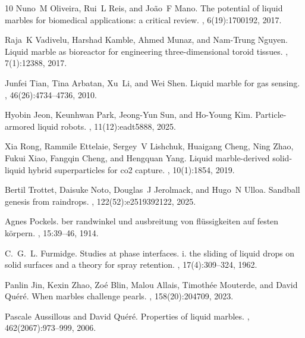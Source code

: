 \documentclass[twocolumn, prl,
 amsmath,amssymb,
 superscriptaddress,aps,
]{revtex4-2}
\begin{document}
\begin{thebibliography}{10}
	Nuno~M Oliveira, Rui~L Reis, and Jo{\~a}o~F Mano.
	\newblock The potential of liquid marbles for biomedical applications: a
	critical review.
	, 6(19):1700192, 2017.
	
	Raja~K Vadivelu, Harshad Kamble, Ahmed Munaz, and Nam-Trung Nguyen.
	\newblock Liquid marble as bioreactor for engineering three-dimensional toroid
	tissues.
	, 7(1):12388, 2017.
	
	Junfei Tian, Tina Arbatan, Xu~Li, and Wei Shen.
	\newblock Liquid marble for gas sensing.
	, 46(26):4734--4736, 2010.
	
	Hyobin Jeon, Keunhwan Park, Jeong-Yun Sun, and Ho-Young Kim.
	\newblock Particle-armored liquid robots.
	, 11(12):eadt5888, 2025.
	
	Xia Rong, Rammile Ettelaie, Sergey~V Lishchuk, Huaigang Cheng, Ning Zhao, Fukui
	Xiao, Fangqin Cheng, and Hengquan Yang.
	\newblock Liquid marble-derived solid-liquid hybrid superparticles for co2
	capture.
	, 10(1):1854, 2019.
	
	Bertil Trottet, Daisuke Noto, Douglas~J Jerolmack, and Hugo~N Ulloa.
	\newblock Sandball genesis from raindrops.
	,
	122(52):e2519392122, 2025.
	
	Agnes Pockels.
	ber randwinkel und ausbreitung von fl{\"u}ssigkeiten auf festen
	k{\"o}rpern.
	, 15:39--46, 1914.
	
	C.~G.~L. Furmidge.
	\newblock Studies at phase interfaces. i. the sliding of liquid drops on solid
	surfaces and a theory for spray retention.
	, 17(4):309--324, 1962.
	
	Panlin Jin, Kexin Zhao, Zo{\'e} Blin, Malou Allais, Timoth{\'e}e Mouterde, and
	David Qu{\'e}r{\'e}.
	\newblock When marbles challenge pearls.
	, 158(20):204709, 2023.
	
	Pascale Aussillous and David Qu{\'e}r{\'e}.
	\newblock Properties of liquid marbles.
	, 462(2067):973--999, 2006.
	

\end{thebibliography}
\end{document}
